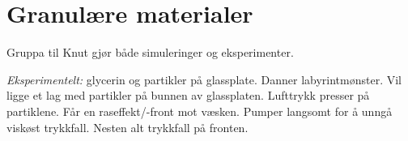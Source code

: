 \documentclass[norsk, 12pt]{article}
\title{}
\begin{document}
\section{Granulære materialer}
    Gruppa til Knut gjør både simuleringer og eksperimenter.
	
    \textit{Eksperimentelt:} glycerin og partikler på glassplate. Danner labyrintmønster.
    Vil ligge et lag med partikler på bunnen av glassplaten. Lufttrykk presser 
    på partiklene.
    Får en raseffekt/-front mot væsken.
    Pumper langsomt for å unngå viskøst trykkfall.
    Nesten alt trykkfall på fronten.
\end{document}

